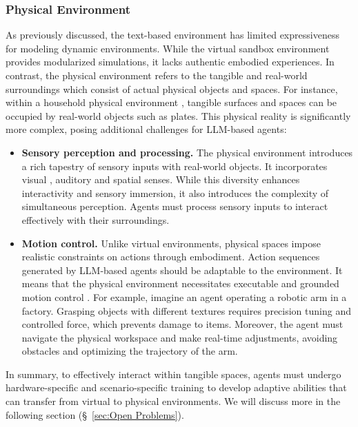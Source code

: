 \subsubsection{Physical Environment}\label{sec:physical environment}
As previously discussed, the text-based environment has limited expressiveness for modeling dynamic environments. While the virtual sandbox environment provides modularized simulations, it lacks authentic embodied experiences. In contrast, the physical environment refers to the tangible and real-world surroundings which consist of actual physical objects and spaces. For instance, within a household physical environment \cite{DBLP:journals/corr/abs-2309-01918}, tangible surfaces and spaces can be occupied by real-world objects such as plates. This physical reality is significantly more complex, posing additional challenges for LLM-based agents:

\begin{itemize}[leftmargin=*]
    \item \textbf{Sensory perception and processing.} The physical environment introduces a rich tapestry of sensory inputs with real-world objects. It incorporates visual \cite{DBLP:conf/icml/DriessXSLCIWTVY23,DBLP:journals/corr/abs-2210-06407}, auditory  \cite{DBLP:conf/nips/00070C22,DBLP:conf/eccv/ChenJSGAIRG20} and spatial senses. While this diversity enhances interactivity and sensory immersion, it also introduces the complexity of simultaneous perception. Agents must process sensory inputs to interact effectively with their surroundings.
    \item \textbf{Motion control.} Unlike virtual environments, physical spaces impose realistic constraints on actions through embodiment. Action sequences generated by LLM-based agents should be adaptable to the environment. It means that the physical environment necessitates executable and grounded motion control \cite{DBLP:conf/icml/HuangAPM22}. For example, imagine an agent operating a robotic arm in a factory. Grasping objects with different textures requires precision tuning and controlled force, which prevents damage to items. Moreover, the agent must navigate the physical workspace and make real-time adjustments, avoiding obstacles and optimizing the trajectory of the arm.
\end{itemize}
In summary, to effectively interact within tangible spaces, agents must undergo hardware-specific and scenario-specific training to develop adaptive abilities that can transfer from virtual to physical environments. We will discuss more in the following section (\S \ \ref{sec:Open Problems}).

